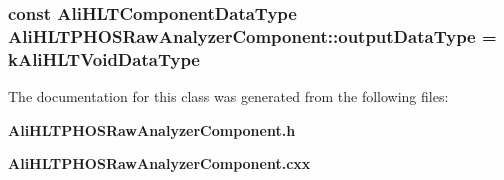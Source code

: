 \subsubsection{\setlength{\rightskip}{0pt plus 5cm}const Ali\-HLTComponent\-Data\-Type {\bf Ali\-HLTPHOSRaw\-Analyzer\-Component::output\-Data\-Type} = k\-Ali\-HLTVoid\-Data\-Type\hspace{0.3cm}{\tt  [static, private]}}\label{classAliHLTPHOSRawAnalyzerComponent_v1}




The documentation for this class was generated from the following files:\begin{CompactItemize}
\item 
{\bf Ali\-HLTPHOSRaw\-Analyzer\-Component.h}\item 
{\bf Ali\-HLTPHOSRaw\-Analyzer\-Component.cxx}\end{CompactItemize}
